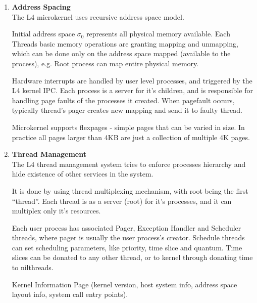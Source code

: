 \documentclass{article}
\begin{document}
        \begin{enumerate}[1., leftmargin = 0.4cm, nosep]
            \item \textbf{Address Spacing} \\
                The L4 microkernel uses recursive address space model.

                Initial address space $\sigma_0$ represents all physical memory available. Each
                Threads
                basic memory operations are granting mapping and unmapping, which can be done only
                on the address space mapped (available to the process), e.g. Root process can map
                entire physical memory.

                Hardware interrupts are handled by user level processes, and triggered by the L4
                kernel IPC.
                Each process is a server for it's children, and is responsible for handling page
                faults of the processes it created. When pagefault occurs, typically thread's
                pager creates new mapping and send it to faulty thread.

                Microkernel supports flexpages - simple pages that can be varied in size. In
                practice all pages larger than 4KB are just a collection of multiple 4K
                pages.

                \pagebreak

            \item \textbf{Thread Management}\\

                The L4 thread management system tries to enforce processes hierarchy and hide
                existence of other services in the system.

                It is done by using thread multiplexing mechanism, with root being the first
                ``thread''. Each thread is as a server (root) for it's processes, and it
                can multiplex only it's resources.

                Each user process has associated Pager, Exception Handler and Scheduler threads,
                where pager is usually the user process's creator.
                Schedule threads can set
                scheduling parameters, like priority, time slice and quantum. Time slices can
                be donated to any other thread, or to kernel through donating time to
                nilthreads.

                Kernel Information Page (kernel version, host system info, address space layout
                info, system call entry points).


\end{enumerate}
\end{document}
